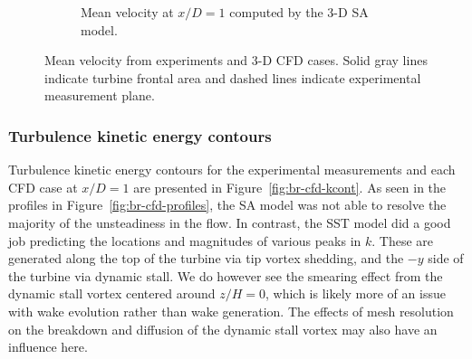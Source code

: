 \documentclass[aip,graphicx]{revtex4-1}
\begin{document}
\begin{figure}
\begin{subfigure}[b]{\textwidth}
        \caption{Mean velocity at $x/D=1$ computed by the 3-D SA model.}

        \label{fig:meancontquiv-SA}
    \end{subfigure}

    \caption{Mean velocity from experiments and 3-D CFD cases. Solid gray lines
        indicate turbine frontal area and dashed lines indicate experimental
        measurement plane.}

    \label{fig:br-cfd-mean-velocity}
\end{figure}


\subsubsection{Turbulence kinetic energy contours}

Turbulence kinetic energy contours for the experimental measurements and each
CFD case at $x/D=1$ are presented in Figure~\ref{fig:br-cfd-kcont}. As seen in
the profiles in Figure~\ref{fig:br-cfd-profiles}, the SA model was not able to
resolve the majority of the unsteadiness in the flow. In contrast, the SST model
did a good job predicting the locations and magnitudes of various peaks in $k$.
These are generated along the top of the turbine via tip vortex shedding, and
the $-y$ side of the turbine via dynamic stall. We do however see the smearing
effect from the dynamic stall vortex centered around $z/H=0$, which is likely
more of an issue with wake evolution rather than wake generation. The effects of
mesh resolution on the breakdown and diffusion of the dynamic stall vortex may
also have an influence here.
\end{document}
